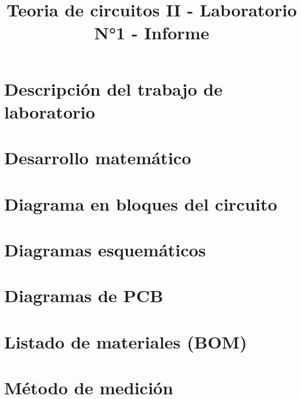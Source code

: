 \documentclass{article}
\title{Teoria de circuitos II - Laboratorio N°1 - Informe}
\begin{document}
	
	

	\tableofcontents
	
	\newpage
	
	\section{Descripción del trabajo de laboratorio}
	
	
	\newpage
	
	\section{Desarrollo matemático}
	
	
	\newpage
	
	\section{Diagrama en bloques del circuito}
	
	
	\newpage
	
	\section{Diagramas esquemáticos}
	
	
	\newpage
	
	\section{Diagramas de PCB}
		
	
	\newpage
	
	\section{Listado de materiales (BOM)}
		
	
	\newpage
	
	\section{Método de medición}
	
	
\end{document}
